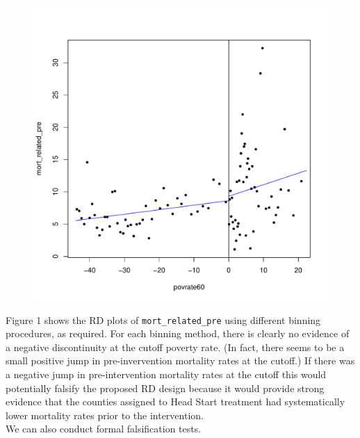 \documentclass[12pt]{article}
\begin{document}
\begin{figure}[htpb!]
\begin{minipage}{0.5\textwidth}
    \end{minipage}\hfill
    \begin{minipage}{0.5\textwidth}
        \includegraphics[width=1\textwidth]{q2-1-qsmv.pdf}
    \end{minipage}
\end{figure}

Figure 1 shows the RD plots of \verb|mort_related_pre| using different binning procedures, as required. For each binning method, there is clearly no evidence of a negative discontinuity at the cutoff poverty rate. (In fact, there seems to be a small positive jump in pre-invervention mortality rates at the cutoff.) If there was a negative jump in pre-intervention mortality rates at the cutoff this would potentially falsify the proposed RD design because it would provide strong evidence that the counties assigned to Head Start treatment had systematically lower mortality rates prior to the intervention.\\

We can also conduct formal falsification tests.
\end{document}
